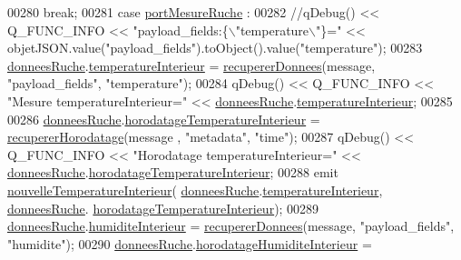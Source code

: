 \begin{DoxyCode}
00280             \textcolor{keywordflow}{break};
00281         \textcolor{keywordflow}{case} \hyperlink{parametres_8h_a0fe68caa1e9147addc96657cc822b937a88419e467bcdd4d9d15dea841fe45d62}{portMesureRuche} :        
00282             \textcolor{comment}{//qDebug() << Q\_FUNC\_INFO << "payload\_fields:\{\(\backslash\)"temperature\(\backslash\)"\}=" <<
       objetJSON.value("payload\_fields").toObject().value("temperature");}
00283             \hyperlink{class_ruche_a1526bfa78f03e0710ad16f880a40c15f}{donneesRuche}.\hyperlink{struct_donnees_ruche_ad6cbda133d2c8abc23fb688d6e565ab2}{temperatureInterieur} = 
      \hyperlink{class_ruche_a68e487fc714c68b7d4f761cad9122b39}{recupererDonnees}(message, \textcolor{stringliteral}{"payload\_fields"}, \textcolor{stringliteral}{"temperature"});
00284             qDebug() << Q\_FUNC\_INFO << \textcolor{stringliteral}{"Mesure temperatureInterieur="} << 
      \hyperlink{class_ruche_a1526bfa78f03e0710ad16f880a40c15f}{donneesRuche}.\hyperlink{struct_donnees_ruche_ad6cbda133d2c8abc23fb688d6e565ab2}{temperatureInterieur};
00285 
00286             \hyperlink{class_ruche_a1526bfa78f03e0710ad16f880a40c15f}{donneesRuche}.\hyperlink{struct_donnees_ruche_a004c7a2447bbcdd2ba212ba2f9866dcd}{horodatageTemperatureInterieur} =  
      \hyperlink{class_ruche_a072193021274bb4308776934c35f7443}{recupererHorodatage}(message , \textcolor{stringliteral}{"metadata"}, \textcolor{stringliteral}{"time"});
00287             qDebug() << Q\_FUNC\_INFO << \textcolor{stringliteral}{"Horodatage temperatureInterieur="} << 
      \hyperlink{class_ruche_a1526bfa78f03e0710ad16f880a40c15f}{donneesRuche}.\hyperlink{struct_donnees_ruche_a004c7a2447bbcdd2ba212ba2f9866dcd}{horodatageTemperatureInterieur};
00288             emit \hyperlink{class_ruche_ac4d6e0c0db4b5c992606bff88759b2c3}{nouvelleTemperatureInterieur}(
      \hyperlink{class_ruche_a1526bfa78f03e0710ad16f880a40c15f}{donneesRuche}.\hyperlink{struct_donnees_ruche_ad6cbda133d2c8abc23fb688d6e565ab2}{temperatureInterieur}, \hyperlink{class_ruche_a1526bfa78f03e0710ad16f880a40c15f}{donneesRuche}.
      \hyperlink{struct_donnees_ruche_a004c7a2447bbcdd2ba212ba2f9866dcd}{horodatageTemperatureInterieur});
00289             \hyperlink{class_ruche_a1526bfa78f03e0710ad16f880a40c15f}{donneesRuche}.\hyperlink{struct_donnees_ruche_a2541ee93816a11da7367b36d4bedc77b}{humiditeInterieur} = 
      \hyperlink{class_ruche_a68e487fc714c68b7d4f761cad9122b39}{recupererDonnees}(message, \textcolor{stringliteral}{"payload\_fields"}, \textcolor{stringliteral}{"humidite"});
00290             \hyperlink{class_ruche_a1526bfa78f03e0710ad16f880a40c15f}{donneesRuche}.\hyperlink{struct_donnees_ruche_a15ebda778958380edd4acff5d6eef5b8}{horodatageHumiditeInterieur} = 

\end{DoxyCode}
